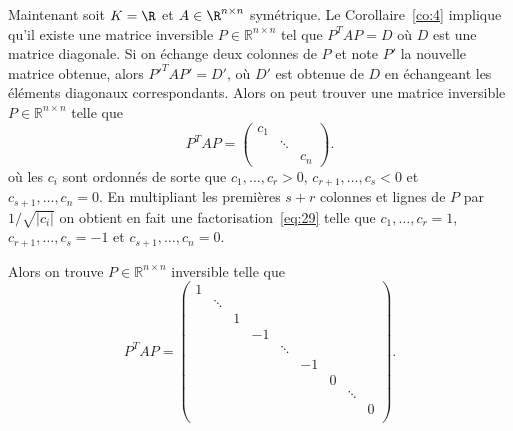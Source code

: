 



Maintenant soit $K = \R$  et $A \in \R^{n \times n}$ symétrique. Le Corollaire~\ref{co:4} implique qu'il existe une matrice inversible $P ∈ ℝ^{n \times n}$ tel que $P^T A P = D$ où $D$ est une matrice diagonale. Si on échange deux colonnes de $P$ et note $P'$ la nouvelle matrice obtenue, alors $P'^T A P' = D'$, où $D'$ est obtenue de $D$ en échangeant les éléments diagonaux correspondants. Alors on peut trouver une matrice inversible $P ∈ ℝ^{n ×n}$ telle que 
\begin{equation}
  \label{eq:29}
  P^T A {P} =
    \begin{pmatrix}
      c_1\\
      & \ddots \\
      && c_n
    \end{pmatrix}. 
\end{equation}
où les  $c_i$ sont ordonnés de sorte que  $c_1,\dots, c_r >0$, $c_{r+1},\dots ,c_s<0$ et $c_{s+1},\dots , c_n = 0$. En multipliant les premières $s+r$ colonnes  et lignes de $P$ par $1/ \sqrt{|c_i|}$ on obtient en fait une factorisation~\eqref{eq:29} telle que 
 $c_1,\dots, c_r =1$, $c_{r+1},\dots ,c_s=-1$ et $c_{s+1},\dots , c_n = 0$. 

Alors on trouve  $P ∈ ℝ^{n ×n}$ inversible telle que 
\begin{equation}
  \label{eq:5}
  P^T A P =
  \begin{pmatrix}
    1 &   \\
      & \ddots &  \\
      &        & 1 \\
      &        &  & -1 \\
      &        &  &    & \ddots \\
      &        &  &    &        & -1 \\
      &        &  &    &        &    & 0 \\
      &        &  &    &        &    &   & \ddots  \\
      &        &  &    &        &    &   &        & 0  \\

  \end{pmatrix}.
\end{equation}


